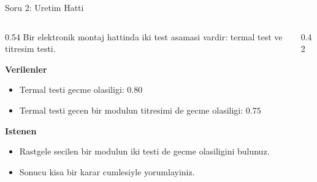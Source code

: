 %

\begin{frame}[t]{Soru 2: Uretim Hatti}
\small
\begin{columns}[T,onlytextwidth]
    \begin{column}{0.54\textwidth}
        Bir elektronik montaj hattinda iki test asamasi vardir: termal test ve
        titresim testi.

        \vspace{0.2cm}
        \textbf{Verilenler}
        \begin{itemize}
            \item Termal testi gecme olasiligi: \(0.80\)
            \item Termal testi gecen bir modulun titresimi de gecme olasiligi: \(0.75\)
        \end{itemize}

        \textbf{Istenen}
        \begin{itemize}
            \item[A.] Rastgele secilen bir modulun iki testi de gecme olasiligini bulunuz.
            \item[B.] Sonucu kisa bir karar cumlesiyle yorumlayiniz.
        \end{itemize}
    \end{column}
    \begin{column}{0.42\textwidth}
        \centering
    \end{column}
\end{columns}
\end{frame}

